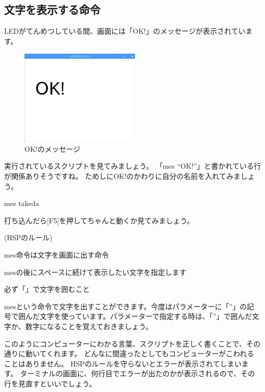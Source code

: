 \clearpage

\subsection{文字を表示する命令}

LEDがてんめつしている間、画面には「OK!」のメッセージが表示されています。

\begin{figure}[H]
    \begin{center}
        \includegraphics[keepaspectratio,width=5.741cm,height=4.572cm]{text02-img/text02-img027.png}
        \caption{OK!のメッセージ}
    \end{center}
\end{figure}

実行されているスクリプトを見てみましょう。
「mes “OK!”」と書かれている行が関係ありそうですね。
ためしに{\textquotedbl}OK!{\textquotedbl}のかわりに自分の名前を入れてみましょう。

\begin{description}
    \item mes {\textquotedbl}takeda{\textquotedbl}
\end{description}

打ち込んだら[F5]を押してちゃんと動くか見てみましょう。

\begin{description}
    \item (HSPのルール)
\end{description}

\begin{description}
    \item mes命令は文字を画面に出す命令
    \item mesの後にスペースに続けて表示したい文字を指定します
    \item 必ず「{\textquotedbl}」で文字を囲むこと
\end{description}

mesという命令で文字を出すことができます。今度はパラメーターに「”」の記号で囲んだ文字を使っています。パラメーターで指定する時は、「”」で囲んだ文字か、数字になることを覚えておきましょう。

このようにコンピューターにわかる言葉、スクリプトを正しく書くことで、その通りに動いてくれます。
どんなに間違ったとしてもコンピューターがこわれることはありません。
HSPのルールを守らないとエラーが表示されてしまいます。
ターミナルの画面に、何行目でエラーが出たのかが表示されるので、その行を見直すといいでしょう。